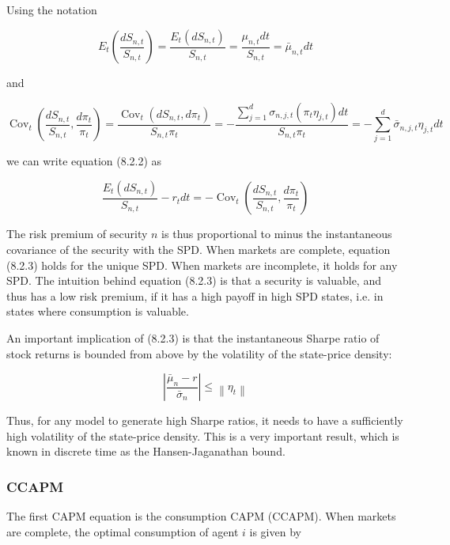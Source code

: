 \documentclass[\topdir/lecture\_notes.tex]{subfiles}
\begin{document}
Using the notation

\begin{equation}
E_{t}\left(\frac{d S_{n, t}}{S_{n, t}}\right)=\frac{E_{t}\left(d S_{n, t}\right)}{S_{n, t}}=\frac{\mu_{n, t} d t}{S_{n, t}}=\bar{\mu}_{n, t} d t
\end{equation}

and

\begin{equation}
\operatorname{Cov}_{t}\left(\frac{d S_{n, t}}{S_{n, t}}, \frac{d \pi_{t}}{\pi_{t}}\right)=\frac{\operatorname{Cov}_{t}\left(d S_{n, t}, d \pi_{t}\right)}{S_{n, t} \pi_{t}}=-\frac{\sum_{j=1}^{d} \sigma_{n, j, t}\left(\pi_{t} \eta_{j, t}\right) d t}{S_{n, t} \pi_{t}}=-\sum_{j=1}^{d} \bar{\sigma}_{n, j, t} \eta_{j, t} d t
\end{equation}

we can write equation (8.2.2) as

\begin{equation}
\frac{E_{t}\left(d S_{n, t}\right)}{S_{n, t}}-r_{t} d t=-\operatorname{Cov}_{t}\left(\frac{d S_{n, t}}{S_{n, t}}, \frac{d \pi_{t}}{\pi_{t}}\right) \label{eq:8.2.3}
\end{equation}

The risk premium of security $n$ is thus proportional to minus the instantaneous covariance of the security with the SPD. When markets are complete, equation (8.2.3) holds for the unique SPD. When markets are incomplete, it holds for any SPD. The intuition behind equation (8.2.3) is that a security is valuable, and thus has a low risk premium, if it has a high payoff in high SPD states, i.e. in states where consumption is valuable.

An important implication of (8.2.3) is that the instantaneous Sharpe ratio of stock returns is bounded from above by the volatility of the state-price density:

\begin{equation}
\left|\frac{\bar{\mu}_{n}-r}{\bar{\sigma}_{n}}\right| \leq\left\|\eta_{t}\right\| \label{eq:8.2.4}
\end{equation}

Thus, for any model to generate high Sharpe ratios, it needs to have a sufficiently high volatility of the state-price density. This is a very important result, which is known in discrete time as the Hansen-Jaganathan bound.

\subsubsection{CCAPM}
The first CAPM equation is the consumption CAPM (CCAPM). When markets are complete, the optimal consumption of agent $i$ is given by
\end{document}
